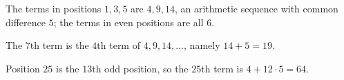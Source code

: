The terms in positions $1,3,5$ are $4,9,14$, an arithmetic sequence with common difference $5$; the terms in even positions are all $6$.

The $7$th term is the $4$th term of $4,9,14,\dots$, namely $14+5=\boxed{19}$.

Position $25$ is the $13$th odd position, so the $25$th term is $4+12\cdot5=\boxed{64}$.
